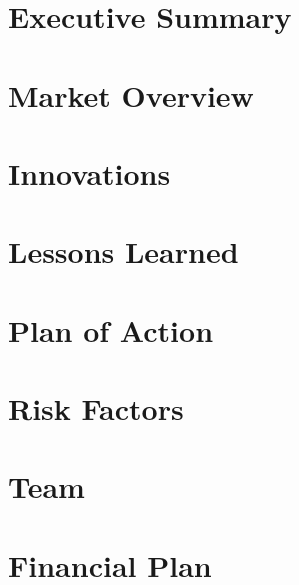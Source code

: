 \documentclass{article}
\begin{document}
\section{Executive Summary}

\section{Market Overview}

\section{Innovations}

\section{Lessons Learned}

\section{Plan of Action}

\section{Risk Factors}

\section{Team}

\section{Financial Plan}
\end{document}
